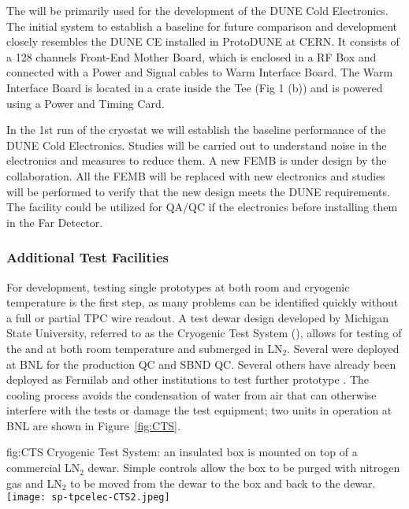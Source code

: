 The  will be primarily used for the development of the DUNE Cold Electronics. The initial system to establish a baseline for future comparison and development closely resembles the DUNE CE installed in ProtoDUNE at CERN. It consists of a 128 channels Front-End Mother Board, which is enclosed in a RF Box and connected with a Power and Signal cables to Warm Interface Board. The Warm Interface Board is located in a crate inside the Tee (Fig 1 (b)) and is powered using a Power and Timing Card.

In the 1st run of the cryostat we will establish the baseline performance of the DUNE Cold Electronics. Studies will be carried out to understand noise in the electronics and measures to reduce them. A new FEMB is under design by the collaboration. All the FEMB will be replaced with new electronics and studies will be performed to verify that the new design meets the DUNE requirements. The facility could be utilized for QA/QC if the electronics before installing them in the Far Detector.

\subsubsection{Additional Test Facilities}
\label{sec:fdsp-tpcelec-qa-facilities-additional}

For  development, testing single prototypes at both room and cryogenic temperature is the first 
step, as many problems can be identified quickly without a full or partial TPC wire readout. A test dewar 
design developed by Michigan State University, referred to as the Cryogenic Test System (), allows for
testing of the  and  at both room temperature and submerged in LN$_2$. Several
 were deployed at BNL for the  production  QC and SBND  QC. Several
others have already been deployed as Fermilab and other institutions to test further prototype .
The  cooling process avoids the condensation of water from air that can otherwise interfere with the 
tests or damage the test equipment; two  units in operation at BNL are shown in Figure~\ref{fig:CTS}.

\begin{dunefigure}
{fig:CTS}
{Cryogenic Test System: an insulated box is mounted on top of a commercial LN$_2$ dewar.  Simple controls allow the box to be purged with nitrogen gas and LN$_2$ to be moved from the dewar to the box and back to the dewar.}
\texttt{[image: sp-tpcelec-CTS2.jpeg]}
\end{dunefigure}


